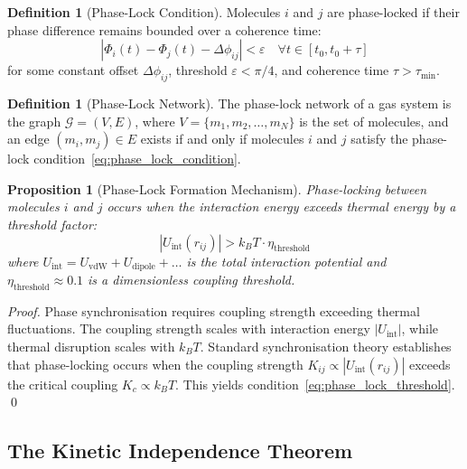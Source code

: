 \documentclass[12pt,a4paper]{article}
\newtheorem{proposition}[theorem]{Proposition}
\theoremstyle{definition}
\newtheorem{definition}[theorem]{Definition}
\theoremstyle{remark}
\newcommand{\phaselockgraph}{\mathcal{G}}
\begin{document}
\begin{definition}[Phase-Lock Condition]
\label{def:phase_lock}
Molecules $i$ and $j$ are phase-locked if their phase difference remains bounded over a coherence time:
\begin{equation}
|\Phi_i(t) - \Phi_j(t) - \Delta\phi_{ij}| < \varepsilon \quad \forall t \in [t_0, t_0 + \tau]
\label{eq:phase_lock_condition}
\end{equation}
for some constant offset $\Delta\phi_{ij}$, threshold $\varepsilon < \pi/4$, and coherence time $\tau > \tau_{\min}$.
\end{definition}

\begin{definition}[Phase-Lock Network]
\label{def:phase_lock_network}
The phase-lock network of a gas system is the graph $\phaselockgraph = (V, E)$, where $V = \{m_1, m_2, \ldots, m_N\}$ is the set of molecules, and an edge $(m_i, m_j) \in E$ exists if and only if molecules $i$ and $j$ satisfy the phase-lock condition~\eqref{eq:phase_lock_condition}.
\end{definition}

\begin{proposition}[Phase-Lock Formation Mechanism]
\label{prop:phase_lock_formation}
Phase-locking between molecules $i$ and $j$ occurs when the interaction energy exceeds thermal energy by a threshold factor:
\begin{equation}
|U_{\text{int}}(r_{ij})| > k_B T \cdot \eta_{\text{threshold}}
\label{eq:phase_lock_threshold}
\end{equation}
where $U_{\text{int}} = U_{\text{vdW}} + U_{\text{dipole}} + \ldots$ is the total interaction potential and $\eta_{\text{threshold}} \approx 0.1$ is a dimensionless coupling threshold.
\end{proposition}

\begin{proof}
Phase synchronisation requires coupling strength exceeding thermal fluctuations. The coupling strength scales with interaction energy $|U_{\text{int}}|$, while thermal disruption scales with $k_B T$. Standard synchronisation theory \citep{pikovsky2001synchronization, kuramoto1975self} establishes that phase-locking occurs when the coupling strength $K_{ij} \propto |U_{\text{int}}(r_{ij})|$ exceeds the critical coupling $K_c \propto k_B T$. This yields condition~\eqref{eq:phase_lock_threshold}. \qed
\end{proof}

\subsection{The Kinetic Independence Theorem}
\end{document}
